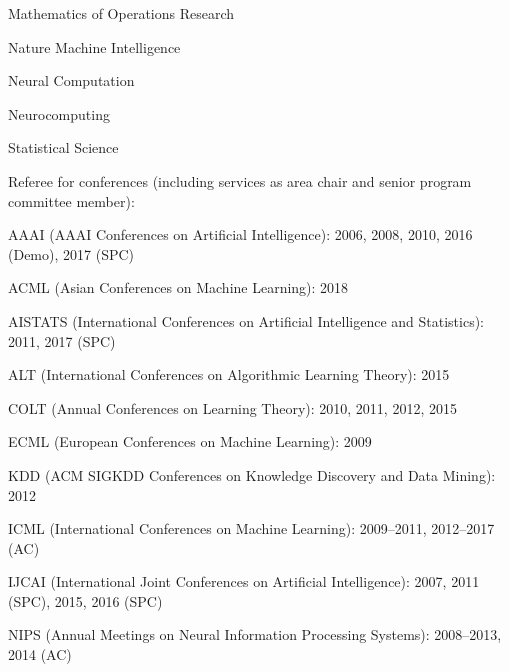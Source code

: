 \documentclass[10pt,twoside,letterpaper]{article}
\newcommand{\negitemspace}{\vspace{1mm}}
\begin{document}
\begin{compactitem}
\begin{compactitem}
\item{Mathematics of Operations Research}

\item{Nature Machine Intelligence}

\item{Neural Computation}

\item{Neurocomputing}

\item{Statistical Science}

\end{compactitem} \negitemspace

\item{Referee for conferences (including services as area chair and senior program committee member):}

\begin{compactitem}

\item{AAAI (AAAI Conferences on Artificial Intelligence): 2006, 2008, 2010, 2016 (Demo), 2017 (SPC)}

\item{ACML (Asian Conferences on Machine Learning): 2018}

\item{AISTATS (International Conferences on Artificial Intelligence and Statistics): 2011, 2017 (SPC)}

\item{ALT (International Conferences on Algorithmic Learning Theory): 2015}

\item{COLT (Annual Conferences on Learning Theory): 2010, 2011, 2012, 2015}

\item{ECML (European Conferences on Machine Learning): 2009}

\item{KDD (ACM SIGKDD Conferences on Knowledge Discovery and Data Mining): 2012}

\item{ICML (International Conferences on Machine Learning): 2009--2011, 2012--2017 (AC)}

\item{IJCAI (International Joint Conferences on Artificial Intelligence): 2007, 2011 (SPC), 2015, 2016 (SPC)}

\item{NIPS (Annual Meetings on Neural Information Processing Systems): 2008--2013, 2014 (AC)}


\end{compactitem}
\end{compactitem}
\end{document}
